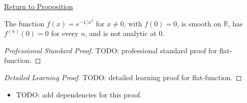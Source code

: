 \newpage
{}
\label{prf:flat-function}

\begin{remark*}[Return]
\hyperref[prop:flat-function]{Return to Proposition}
\end{remark*}

\begin{proposition*}
The function \(f(x)=e^{-1/x^2}\) for \(x\neq 0\), with \(f(0)=0\), is smooth on \(\mathbb{R}\), has \(f^{(n)}(0)=0\) for every \(n\), and is not analytic at \(0\).
\end{proposition*}

\begin{proof}[Professional Standard Proof]
\LRAProofBodyStart
TODO: professional standard proof for flat-function.
\end{proof}

\begin{proof}[Detailed Learning Proof]
\LRAProofBodyStart
TODO: detailed learning proof for flat-function.
\end{proof}

\begin{remark*}
\end{remark*}

\begin{dependencies}
\begin{itemize}
  \item TODO: add dependencies for this proof.
\end{itemize}
\end{dependencies}

\clearpage
